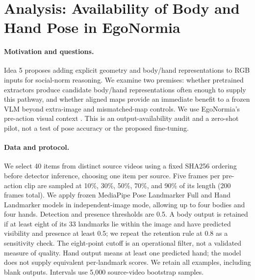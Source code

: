 \section{Analysis: Availability of Body and Hand Pose in EgoNormia}
\paragraph{Motivation and questions.} Idea 5 proposes adding explicit geometry and body/hand representations to RGB inputs for social-norm reasoning. We examine two premises: whether pretrained extractors produce candidate body/hand representations often enough to supply this pathway, and whether aligned maps provide an immediate benefit to a frozen VLM beyond extra-image and mismatched-map controls. We use EgoNormia's pre-action visual context \citep{rezaei2025egonormia}. This is an output-availability audit and a zero-shot pilot, not a test of pose accuracy or the proposed fine-tuning.
\paragraph{Data and protocol.} We select 40 items from distinct source videos using a fixed SHA256 ordering before detector inference, choosing one item per source. Five frames per pre-action clip are sampled at 10\%, 30\%, 50\%, 70\%, and 90\% of its length (200 frames total). We apply frozen MediaPipe Pose Landmarker Full and Hand Landmarker models in independent-image mode, allowing up to four bodies and four hands. Detection and presence thresholds are 0.5. A body output is retained if at least eight of its 33 landmarks lie within the image and have predicted visibility and presence at least 0.5; we repeat the retention rule at 0.8 as a sensitivity check. The eight-point cutoff is an operational filter, not a validated measure of quality. Hand output means at least one predicted hand; the model does not supply equivalent per-landmark scores. We retain all examples, including blank outputs. Intervals use 5,000 source-video bootstrap samples.
